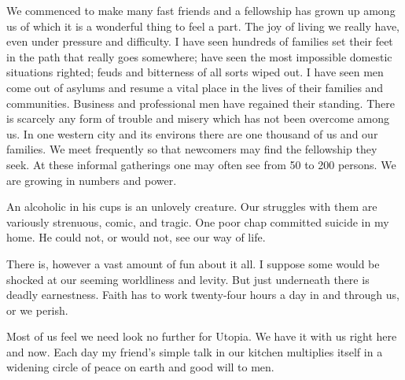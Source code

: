 We commenced to make many fast friends and a fellowship has grown up among us of which it is a wonderful thing to feel a part.
The joy of living we really have, even under pressure and difficulty.
I have seen hundreds of families set their feet in the path that really goes somewhere; 
have seen the most impossible domestic situations righted; feuds and bitterness of all sorts wiped out.  
I have seen men come out of asylums and resume a vital place in the lives of their families and communities.  
Business and professional men have regained their standing.  
There is scarcely any form of trouble and misery which has not been overcome among us.  
In one western city and its environs there are one thousand of us and our families.  
We meet frequently so that newcomers may find the fellowship they seek.  
At these informal gatherings one may often see from 50 to 200 persons.  
We are growing in numbers and power.

An alcoholic in his cups is an unlovely creature.  
Our struggles with them are variously strenuous, comic, and tragic.  
One poor chap committed suicide in my home.  
He could not, or would not, see our way of life.

There is, however a vast amount of fun about it all.  
I suppose some would be shocked at our seeming worldliness and levity.  
But just underneath there is deadly earnestness.  
Faith has to work twenty-four hours a day in and through us, or we perish.

Most of us feel we need look no further for Utopia.  
We have it with us right here and now.  
Each day my friend's simple talk in our kitchen multiplies itself in a widening circle of peace on earth and good will to men.

